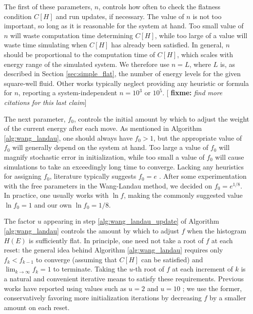 \documentclass[11pt]{article}
\newcommand{\p}[1]{\left(#1\right)} %
\renewcommand{\sp}[1]{\left[#1\right]} %
\newcommand{\red}[1]{{\bf \color{red} #1}}
\newcommand{\fixme}[1]{[\red{fixme:} \emph{#1}]}
\begin{document}
The first of these parameters, $n$, controls how often to check the
flatness condition $C\sp{H}$ and run updates, if necessary. The value
of $n$ is not too important, so long as it is reasonable for the
system at hand. Too small value of $n$ will waste computation time
determining $C\sp{H}$, while too large of a value will waste time
simulating when $C\sp{H}$ has already been satisfied. In general, $n$
should be proportional to the computation time of $C\sp{H}$, which
scales with energy range of the simulated system. We therefore use
$n=L$, where $L$ is, as described in Section \ref{sec:simple_flat},
the number of energy levels for the given square-well fluid. Other
works typically neglect providing any heuristic or formula for $n$,
reporting a system-independent $n=10^3$\cite{wang_landau_mod} or
$10^5$\cite{wang_landau}.  \fixme{find more citations for this last
  claim}

The next parameter, $f_0$, controls the initial amount by which to
adjust the weight of the current energy after each move. As mentioned
in Algorithm \ref{alg:wang_landau}, one should always have $f_0>1$,
but the appropriate value of $f_0$ will generally depend on the system
at hand. Too large a value of $f_0$ will magnify stochastic error in
initialization, while too small a value of $f_0$ will cause
simulations to take an exceedingly long time to converge. Lacking any
heuristics for assigning $f_0$, literature typically suggests $f_0=e$
\cite{wang_landau}. After some experimentation with the free
parameters in the Wang-Landau method, we decided on $f_0=e^{1/8}$. In
practice, one usually works with $\ln f$, making the commonly
suggested value $\ln f_0=1$ and our own $\ln f_0=1/8$.

The factor $u$ appearing in step \ref{alg:wang_landau_update} of
Algorithm \ref{alg:wang_landau} controls the amount by which to adjust
$f$ when the histogram $H\p{E}$ is sufficiently flat. In principle,
one need not take a root of $f$ at each reset: the general idea behind
Algorithm \ref{alg:wang_landau} requires only $f_k<f_{k-1}$ to
converge (assuming that $C\sp{H}$ can be satisfied) and
$\lim_{k\to\infty}f_k=1$ to terminate. Taking the $u$-th root of $f$
at each increment of $k$ is a natural and convenient iterative means
to satisfy these requirements. Previous works have reported using
values such as $u=2$ \cite{wang_landau, wang_landau_mod} and $u=10$
\cite{wang_landau_analysis}; we use the former, conservatively
favoring more initialization iterations by decreasing $f$ by a smaller
amount on each reset.
\end{document}
